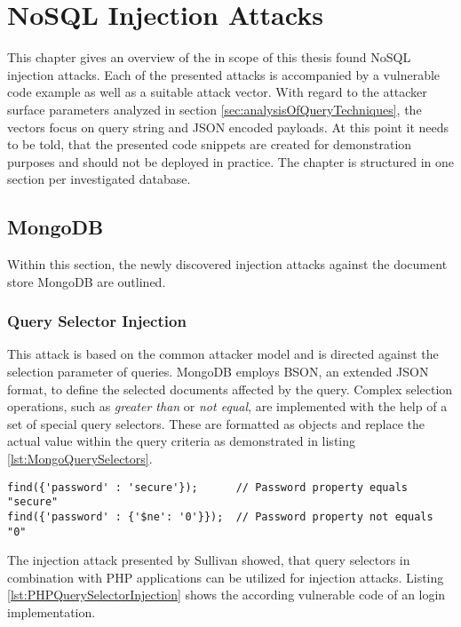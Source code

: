 \chapter{NoSQL Injection Attacks}
This chapter gives an overview of the in scope of this thesis found NoSQL injection attacks. Each of the presented attacks is accompanied by a vulnerable code example as well as a suitable attack vector. With regard to the attacker surface parameters analyzed in section \ref{sec:analysisOfQueryTechniques}, the vectors focus on query string and JSON encoded payloads. At this point it needs to be told, that the presented code snippets are created for demonstration purposes and should not be deployed in practice. The chapter is structured in one section per investigated database.

\section{MongoDB}
Within this section, the newly discovered injection attacks against the document store MongoDB are outlined.

\subsection{Query Selector Injection}
This attack is based on the common attacker model and is directed against the selection parameter of queries. MongoDB employs BSON, an extended JSON format, to define the selected documents affected by the query. Complex selection operations, such as \emph{greater than} or \emph{not equal}, are implemented with the help of a set of special query selectors. These are formatted as objects and replace the actual value within the query criteria as demonstrated in listing \ref{lst:MongoQuerySelectors}. 

\begin{lstlisting}[caption={Example for MongoDB's query selectors}, label={lst:MongoQuerySelectors}]
find({'password' : 'secure'});      // Password property equals "secure"
find({'password' : {'$ne': '0'}});  // Password property not equals "0"
\end{lstlisting}

The injection attack presented by Sullivan \cite{Sullivan:2011} showed, that query selectors in combination with PHP applications can be utilized for injection attacks. Listing \ref{lst:PHPQuerySelectorInjection} shows the according vulnerable code of an login implementation. \\

